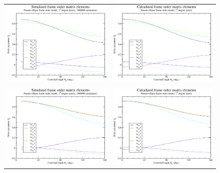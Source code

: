 \begin{figure}
\centering
  \begin{tabular}{@{}cc@{}}
    \includegraphics[width=.5\textwidth]{images/frame_order_matrix/Sij_pseudo-ellipse_out_of_frame_theta_x_ens1000000.eps} &
    \includegraphics[width=.5\textwidth]{images/frame_order_matrix/Sij_pseudo-ellipse_out_of_frame_theta_x_calc.eps} \\
    \\[-5pt]
    \includegraphics[width=.5\textwidth]{images/frame_order_matrix/Sij_pseudo-ellipse_out_of_frame_theta_y_ens1000000.eps} &
    \includegraphics[width=.5\textwidth]{images/frame_order_matrix/Sij_pseudo-ellipse_out_of_frame_theta_y_calc.eps} \\

\end{tabular}
\end{figure}
